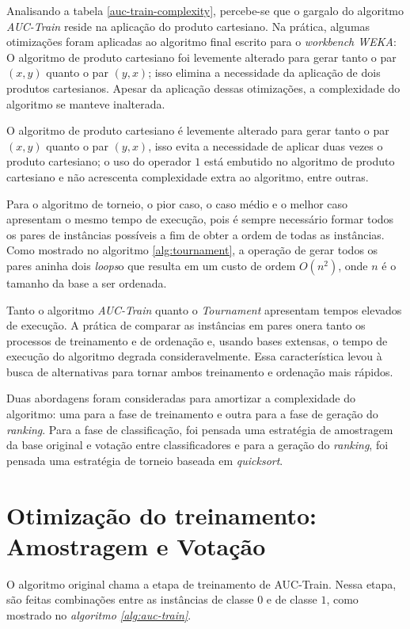 Analisando a tabela \ref{auc-train-complexity}, percebe-se que o gargalo do algoritmo \emph{AUC-Train} reside na aplicação do produto cartesiano. Na prática, algumas otimizações foram aplicadas ao algoritmo final escrito para o \emph{workbench WEKA}:
O algoritmo de produto cartesiano foi levemente alterado para gerar tanto o par $(x, y)$ quanto o par $(y, x)$; isso elimina a necessidade da aplicação de dois produtos cartesianos.
Apesar da aplicação dessas otimizações, a complexidade do algoritmo se manteve inalterada.

O algoritmo de produto cartesiano é levemente alterado para gerar tanto o par $(x, y)$ quanto o par $(y, x)$, isso evita a necessidade de aplicar duas vezes o produto cartesiano; o uso do operador $1$ está embutido no algoritmo de produto cartesiano e não acrescenta complexidade extra ao algoritmo, entre outras.

Para o algoritmo de torneio, o pior caso, o caso médio e o melhor caso apresentam o mesmo tempo de execução, pois é sempre necessário formar todos os pares de instâncias possíveis a fim de obter a ordem de todas as instâncias. Como mostrado no algoritmo \ref{alg:tournament}, a operação de gerar todos os pares aninha dois \emph{loops}o que resulta em um custo de ordem $O(n^2)$, onde $n$ é o tamanho da base a ser ordenada.

Tanto o algoritmo \emph{AUC-Train} quanto o \emph{Tournament} apresentam tempos elevados de execução. A prática de comparar as instâncias em pares onera tanto os processos de treinamento e de ordenação e, usando bases extensas, o tempo de execução do algoritmo degrada consideravelmente. Essa característica levou à busca de alternativas para tornar ambos treinamento e ordenação mais rápidos.

Duas abordagens foram consideradas para amortizar a complexidade do algoritmo: uma para a fase de treinamento e outra para a fase de geração do \emph{ranking}. Para a fase de classificação, foi pensada uma estratégia de amostragem da base original e votação entre classificadores e para a geração do \emph{ranking}, foi pensada uma estratégia de torneio baseada em \emph{quicksort}.

\section{Otimização do treinamento: Amostragem e Votação}
O algoritmo original chama a etapa de treinamento de AUC-Train. Nessa etapa, são feitas combinações entre as instâncias de classe $0$ e de classe $1$, como mostrado no \emph{algoritmo \ref{alg:auc-train}}.

